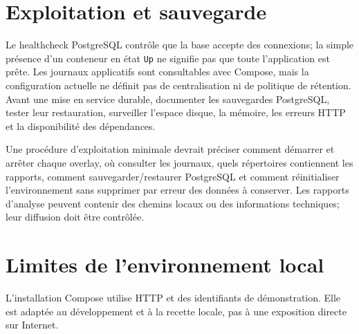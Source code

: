 \documentclass[11pt,a4paper]{report}
\begin{document}
\section{Exploitation et sauvegarde}
Le healthcheck PostgreSQL contrôle que la base accepte des connexions; la simple présence d'un conteneur en état \texttt{Up} ne signifie pas que toute l'application est prête. Les journaux applicatifs sont consultables avec Compose, mais la configuration actuelle ne définit pas de centralisation ni de politique de rétention. Avant une mise en service durable, documenter les sauvegardes PostgreSQL, tester leur restauration, surveiller l'espace disque, la mémoire, les erreurs HTTP et la disponibilité des dépendances.

Une procédure d'exploitation minimale devrait préciser comment démarrer et arrêter chaque overlay, où consulter les journaux, quels répertoires contiennent les rapports, comment sauvegarder/restaurer PostgreSQL et comment réinitialiser l'environnement sans supprimer par erreur des données à conserver. Les rapports d'analyse peuvent contenir des chemins locaux ou des informations techniques; leur diffusion doit être contrôlée.

\section{Limites de l'environnement local}
L'installation Compose utilise HTTP et des identifiants de démonstration. Elle est adaptée au développement et à la recette locale, pas à une exposition directe sur Internet.
\end{document}

